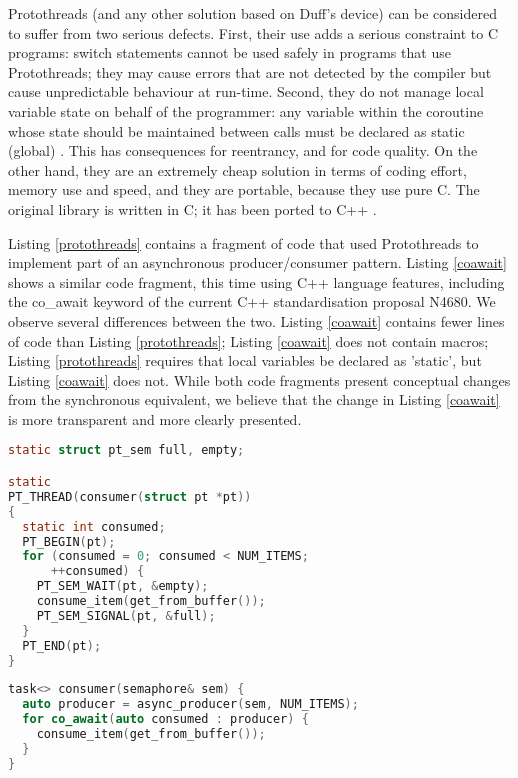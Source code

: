 Protothreads (and any other solution based on Duff's device) can be considered to suffer from two serious defects. First, their use adds a serious constraint to C programs: switch statements cannot be used safely in programs that use Protothreads; they may cause errors that are not detected by the compiler but cause unpredictable behaviour at run-time. Second, they do not manage local variable state on behalf of the programmer: any variable within the coroutine whose state should be maintained between calls must be declared as static (global) \cite{Dunkels2005b}. This has consequences for reentrancy, and for code quality. On the other hand, they are an extremely cheap solution in terms of coding effort, memory use and speed, and they are portable, because they use pure C. The original library is written in C; it has been ported to C++ \cite{Paisley2006}.

Listing \ref{protothreads} contains a fragment of code that used Protothreads to implement part of an asynchronous producer/consumer pattern. Listing \ref{coawait} shows a similar code fragment, this time using C++ language features, including the co\_await keyword of the current C++ standardisation proposal N4680. We observe several differences between the two. Listing \ref{coawait} contains fewer lines of code than Listing \ref{protothreads}; Listing \ref{coawait} does not contain macros; Listing \ref{protothreads} requires that local variables be declared as 'static', but Listing \ref{coawait} does not. While both code fragments present conceptual changes from the synchronous equivalent, we believe that the change in Listing \ref{coawait} is more transparent and more clearly presented.

\begin{lstlisting}[language=C, caption=Fragment of Protothreads code for asynchronous producer/consumer threads, label=protothreads, float=t]
static struct pt_sem full, empty;

static
PT_THREAD(consumer(struct pt *pt))
{
  static int consumed;
  PT_BEGIN(pt);
  for (consumed = 0; consumed < NUM_ITEMS; 
      ++consumed) {
    PT_SEM_WAIT(pt, &empty);
    consume_item(get_from_buffer());
    PT_SEM_SIGNAL(pt, &full);
  }
  PT_END(pt);
}
\end{lstlisting}

\begin{lstlisting}[language=C++, caption=C++ code fragment using co\_await for asynchronous producer/consumer threads, label=coawait, float=t]
task<> consumer(semaphore& sem) {
  auto producer = async_producer(sem, NUM_ITEMS);
  for co_await(auto consumed : producer) {
    consume_item(get_from_buffer());
  }
}
\end{lstlisting}

